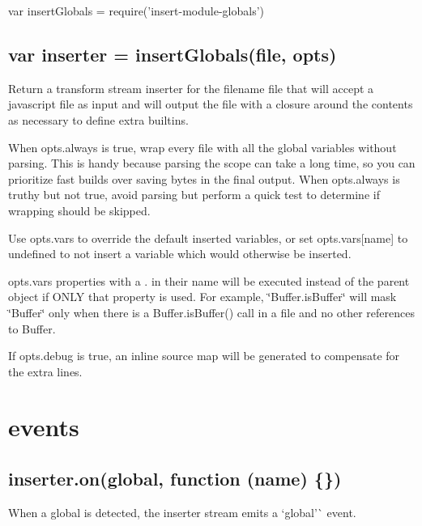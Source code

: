 \begin{DoxyCode}
var insertGlobals = require('insert-module-globals')
\end{DoxyCode}


\subsection*{var inserter = insert\+Globals(file, opts)}

Return a transform stream {\ttfamily inserter} for the filename {\ttfamily file} that will accept a javascript file as input and will output the file with a closure around the contents as necessary to define extra builtins.

When {\ttfamily opts.\+always} is true, wrap every file with all the global variables without parsing. This is handy because parsing the scope can take a long time, so you can prioritize fast builds over saving bytes in the final output. When {\ttfamily opts.\+always} is truthy but not true, avoid parsing but perform a quick test to determine if wrapping should be skipped.

Use {\ttfamily opts.\+vars} to override the default inserted variables, or set {\ttfamily opts.\+vars\mbox{[}name\mbox{]}} to {\ttfamily undefined} to not insert a variable which would otherwise be inserted.

{\ttfamily opts.\+vars} properties with a {\ttfamily .} in their name will be executed instead of the parent object if O\+N\+LY that property is used. For example, {\ttfamily \char`\"{}\+Buffer.\+is\+Buffer\char`\"{}} will mask {\ttfamily \char`\"{}\+Buffer\char`\"{}} only when there is a {\ttfamily Buffer.\+is\+Buffer()} call in a file and no other references to {\ttfamily Buffer}.

If {\ttfamily opts.\+debug} is true, an inline source map will be generated to compensate for the extra lines.

\section*{events}

\subsection*{inserter.\+on(\textquotesingle{}global\textquotesingle{}, function (name) \{\})}

When a global is detected, the inserter stream emits a `\textquotesingle{}global'\`{} event.

